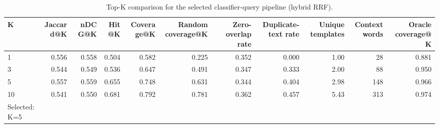 \begin{table}[t]
\centering
\scriptsize
\begin{tabular}{lrrrrrrrrrr}
\hline
K & Jaccard@K & nDCG@K & Hit@K & Coverage@K & Random coverage@K & Zero-overlap rate & Duplicate-text rate & Unique templates & Context words & Oracle coverage@K \\
\hline
1 & 0.556 & 0.558 & 0.504 & 0.582 & 0.225 & 0.352 & 0.000 & 1.00 & 28 & 0.881 \\
3 & 0.544 & 0.549 & 0.536 & 0.647 & 0.491 & 0.347 & 0.333 & 2.00 & 88 & 0.950 \\
5 & 0.557 & 0.559 & 0.655 & 0.748 & 0.631 & 0.344 & 0.404 & 2.98 & 148 & 0.966 \\
10 & 0.541 & 0.550 & 0.681 & 0.792 & 0.781 & 0.362 & 0.457 & 5.43 & 313 & 0.974 \\
Selected: K=5 &  &  &  &  &  &  &  &  &  &  \\
\hline
\end{tabular}
\caption{Top-K comparison for the selected classifier-query pipeline (hybrid RRF).}
\label{tab:table3_top_k_comparison}
\end{table}
